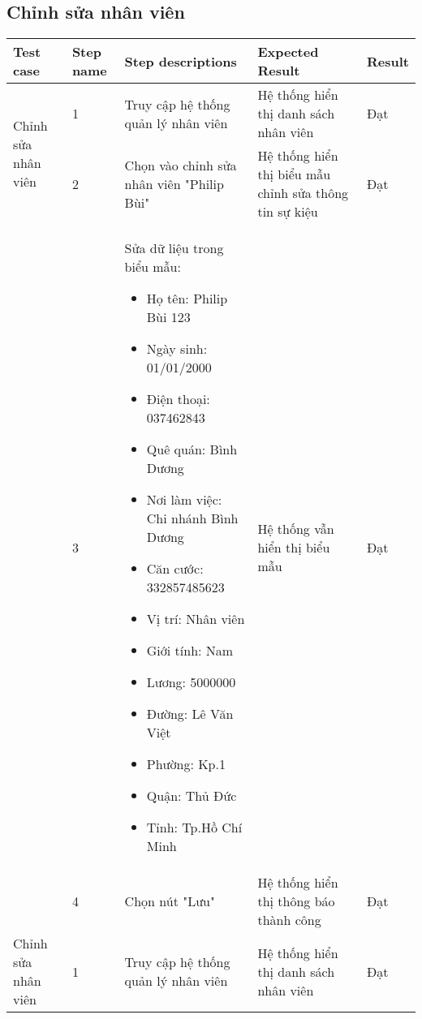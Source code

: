 \subsection{Chỉnh sửa nhân viên}
{
    \setlength\extrarowheight{6pt}
    \begin{longtable}{| p{2.5cm}| p{1cm}| p{5.5cm}| p{4.5cm} | p{1.5cm} |}
        \hline
        \textbf{Test case} & \textbf{Step name} & \textbf{Step descriptions} & \textbf{Expected Result} & \textbf{Result} \\
        \hline
        \multirow[t]{2}{2.5cm}{Chỉnh sửa nhân viên} & 1 & Truy cập hệ thống quản lý nhân viên & Hệ thống hiển thị danh sách nhân viên & Đạt \\
        \cline{2-5}
         & 2 & Chọn vào chỉnh sửa nhân viên "Philip Bùi" & Hệ thống hiển thị biểu mẫu chỉnh sửa thông tin sự kiệu & Đạt \\
        \cline{2-5}
        & 3 & Sửa dữ liệu trong biểu mẫu:
        \begin{itemize}
            \item Họ tên: Philip Bùi 123
            \item Ngày sinh: 01/01/2000
            \item Điện thoại: 037462843
            \item Quê quán: Bình Dương
            \item Nơi làm việc: Chi nhánh Bình Dương
            \item Căn cước: 332857485623
            \item Vị trí: Nhân viên
            \item Giới tính: Nam
            \item Lương: 5000000
            \item Đường: Lê Văn Việt
            \item Phường: Kp.1
            \item Quận: Thủ Đức 
            \item Tỉnh: Tp.Hồ Chí Minh
        \end{itemize} & Hệ thống vẫn hiển thị biểu mẫu & Đạt \\
        \cline{2-5}
         & 4 & Chọn nút "Lưu" & Hệ thống hiển thị thông báo thành công & Đạt \\
        \hline
        \multirow[t]{2}{2.5cm}{Chỉnh sửa nhân viên} & 1 & Truy cập hệ thống quản lý nhân viên & Hệ thống hiển thị danh sách nhân viên & Đạt \\

\end{longtable}}
